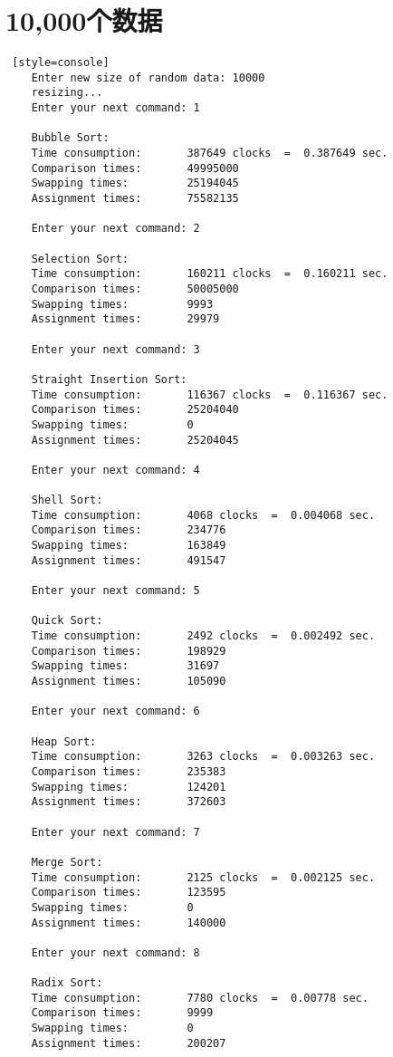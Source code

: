 \section{10,000个数据}
\begin{lstlisting} [style=console]
    Enter new size of random data: 10000
    resizing...
    Enter your next command: 1

    Bubble Sort:
    Time consumption:		387649 clocks  =  0.387649 sec.
    Comparison times:		49995000
    Swapping times:  		25194045
    Assignment times:		75582135
    
    Enter your next command: 2
    
    Selection Sort:
    Time consumption:		160211 clocks  =  0.160211 sec.
    Comparison times:		50005000
    Swapping times:  		9993
    Assignment times:		29979
    
    Enter your next command: 3
    
    Straight Insertion Sort:
    Time consumption:		116367 clocks  =  0.116367 sec.
    Comparison times:		25204040
    Swapping times:  		0
    Assignment times:		25204045
    
    Enter your next command: 4
    
    Shell Sort:
    Time consumption:		4068 clocks  =  0.004068 sec.
    Comparison times:		234776
    Swapping times:  		163849
    Assignment times:		491547
    
    Enter your next command: 5
    
    Quick Sort:
    Time consumption:		2492 clocks  =  0.002492 sec.
    Comparison times:		198929
    Swapping times:  		31697
    Assignment times:		105090
    
    Enter your next command: 6
    
    Heap Sort:
    Time consumption:		3263 clocks  =  0.003263 sec.
    Comparison times:		235383
    Swapping times:  		124201
    Assignment times:		372603
    
    Enter your next command: 7
    
    Merge Sort:
    Time consumption:		2125 clocks  =  0.002125 sec.
    Comparison times:		123595
    Swapping times:  		0
    Assignment times:		140000
    
    Enter your next command: 8
    
    Radix Sort:
    Time consumption:		7780 clocks  =  0.00778 sec.
    Comparison times:		9999
    Swapping times:  		0
    Assignment times:		200207
\end{lstlisting}

